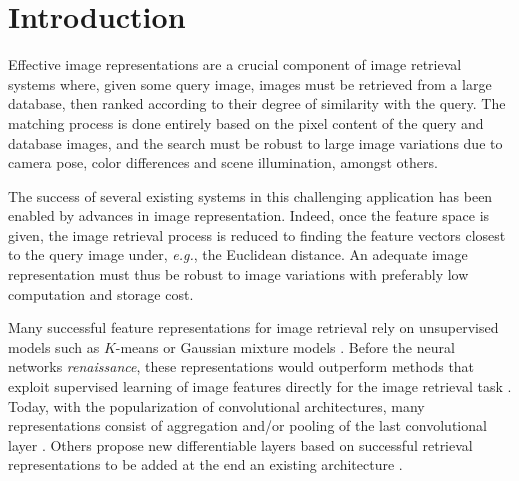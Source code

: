 \section{Introduction}



Effective image 
representations are a crucial component of image retrieval systems 
where, given some query image,  images must be retrieved from a large 
database, then ranked according to their degree of similarity with the 
query.
The matching process is done entirely based on the pixel content of the query and database images, and the search must be robust to large image variations due to camera pose, color differences and scene illumination, amongst others.


The success of several existing systems in this challenging application has been enabled by advances in image representation. %
Indeed, once the feature space is given,
the image retrieval process is reduced to finding the feature vectors closest to the query image under, \textit{e.g.}, the Euclidean distance. An adequate image representation must thus be robust to image variations with preferably low computation and storage cost.


Many successful feature representations for image retrieval rely on unsupervised models such as $K$-means \cite{Delhumeau2013} or Gaussian mixture models \cite{Perronnin2010}. Before the neural networks \textit{renaissance}, these representations would outperform methods that exploit supervised learning of image features directly for the image retrieval task \cite{Bilen2015,Rana}.
Today, with the popularization of convolutional architectures, many representations consist of aggregation and/or pooling of the last convolutional layer \cite{babenko15,GoAlReLa16,KaMeOs16}.
Others propose new differentiable layers based on successful retrieval representations to be added at the end an existing architecture \cite{Arandjelovic15}.


